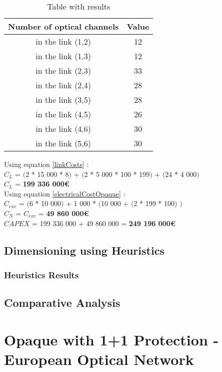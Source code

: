 \begin{table}[h!]
\centering
\begin{tabular}{|| c | c||}
 \hline
 Number of optical channels & Value \\
 \hline\hline
 in the link (1,2) & 12 \\
 in the link (1,3) & 12 \\
 in the link (2,3) & 33 \\
 in the link (2,4) & 28 \\
 in the link (3,5) & 28 \\
 in the link (4,5) & 26 \\
 in the link (4,6) & 30 \\
 in the link (5,6) & 30 \\
 \hline
\end{tabular}
\caption{Table with results}
\label{result_ILP2_p}
\end{table}


Using equation \ref{linkCosts} : \\
$C_L$ = $($2 * 15 000 * 8$)$ + $($2 * 5 000 * 100 * 199$)$ + $($24 * 4 000$)$ \\
$C_L$ = \textbf{199 336 000\euro} \\

Using equation \ref{electricalCostOpaque} : \\
$C_{exc}$ = $($6 * 10 000$)$ + 1 000 * $($10 000 + $($2 * 199 * 100$)$ $)$ \\
$C_N$ = $C_{exc}$ = \textbf{49 860 000\euro} \\

$CAPEX$ = 199 336 000 + 49 860 000 = \textbf{249 196 000\euro}\\

\subsection{Dimensioning using Heuristics}

\subsubsection{Heuristics Results}

\subsection{Comparative Analysis}


\newpage
\section{Opaque with 1+1 Protection - European Optical Network}

